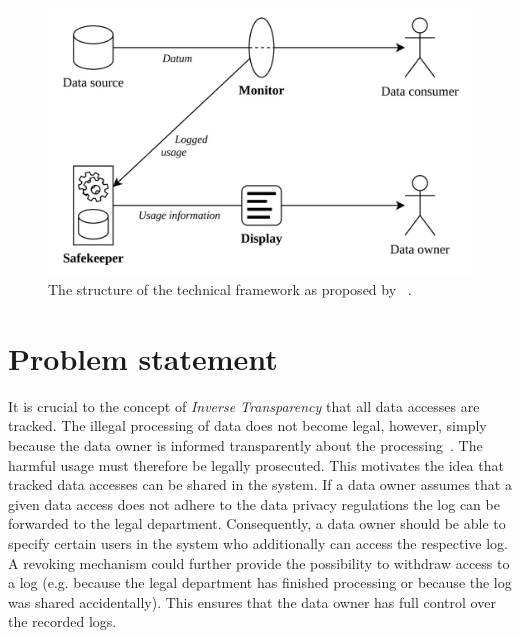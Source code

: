 \documentclass[../main.tex]{subfiles}
\begin{document}
\begin{figure}[ht]
    \includegraphics[scale=0.15]{../img/01/toolchain.jpg}
    \centering
    \caption[Existing toolchain]{The structure of the technical framework as proposed by \citeauthor{Zieglmeier2021}~\cite{Zieglmeier2021}.}
    \label{fig:toolchain}
\end{figure}

\section{Problem statement}

It is crucial to the concept of \emph{Inverse Transparency} that all data accesses are tracked.
The illegal processing of data does not become legal, however, simply because the data owner is informed transparently about the processing~\cite{Boes2022}.
The harmful usage must therefore be legally prosecuted.
This motivates the idea that tracked data accesses can be shared in the system.
If a data owner assumes that a given data access does not adhere to the data privacy regulations the log can be forwarded to the legal department.
Consequently, a data owner should be able to specify certain users in the system who additionally can access the respective log.
A revoking mechanism could further provide the possibility to withdraw access to a log (e.g. because the legal department has finished processing or because the log was shared accidentally).
This ensures that the data owner has full control over the recorded logs.
\end{document}
